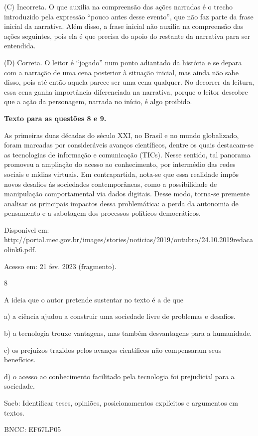 (C) Incorreta. O que auxilia na compreensão das ações narradas é o
trecho introduzido pela expressão ``pouco antes desse evento'', que não
faz parte da frase inicial da narrativa. Além disso, a frase inicial não
auxilia na compreensão das ações seguintes, pois ela é que precisa do
apoio do restante da narrativa para ser entendida.

(D) Correta. O leitor é ``jogado'' num ponto adiantado da história e se
depara com a narração de uma cena posterior à situação inicial, mas
ainda não sabe disso, pois até então aquela parece ser uma cena
qualquer. No decorrer da leitura, essa cena ganha importância
diferenciada na narrativa, porque o leitor descobre que a ação da
personagem, narrada no início, é algo proibido.

\textbf{Texto para as questões 8 e 9.}

As primeiras duas décadas do século XXI, no Brasil e no mundo
globalizado, foram marcadas por consideráveis avanços científicos,
dentre os quais destacam-se as tecnologias de informação e comunicação
(TICs). Nesse sentido, tal panorama promoveu a ampliação do acesso ao
conhecimento, por intermédio das redes sociais e mídias virtuais. Em
contrapartida, nota-se que essa realidade impôs novos desafios às
sociedades contemporâneas, como a possibilidade de manipulação
comportamental via dados digitais. Desse modo, torna-se premente
analisar os principais impactos dessa problemática: a perda da autonomia
de pensamento e a sabotagem dos processos políticos democráticos.

Disponível em:
http://portal.mec.gov.br/images/stories/noticias/2019/outubro/24.10.2019redacaolink6.pdf.

Acesso em: 21 fev. 2023 (fragmento).

\num{8}

A ideia que o autor pretende sustentar no texto é a de que

a) a ciência ajudou a construir uma sociedade livre de problemas e
desafios.

b) a tecnologia trouxe vantagens, mas também desvantagens para a
humanidade.

c) os prejuízos trazidos pelos avanços científicos não compensaram seus
benefícios.

d) o acesso ao conhecimento facilitado pela tecnologia foi prejudicial
para a sociedade.

Saeb: Identificar teses, opiniões, posicionamentos explícitos e
argumentos em textos.

BNCC: EF67LP05

